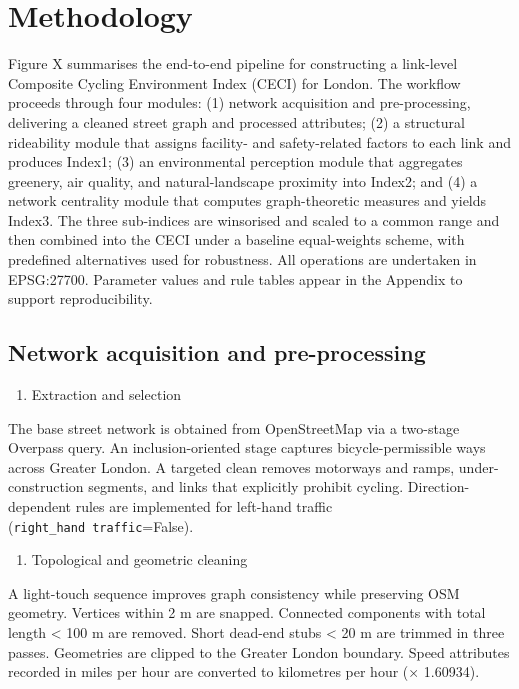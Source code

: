 \documentclass[
  12pt,
  oneside]{book}
\providecommand{\tightlist}{%
  \setlength{\itemsep}{0pt}\setlength{\parskip}{0pt}}
\begin{document}
\chapter{Methodology}\label{methodology}

Figure X summarises the end-to-end pipeline for constructing a link-level Composite Cycling Environment Index (CECI) for London. The workflow proceeds through four modules: (1) network acquisition and pre-processing, delivering a cleaned street graph and processed attributes; (2) a structural rideability module that assigns facility- and safety-related factors to each link and produces Index1; (3) an environmental perception module that aggregates greenery, air quality, and natural-landscape proximity into Index2; and (4) a network centrality module that computes graph-theoretic measures and yields Index3. The three sub-indices are winsorised and scaled to a common range and then combined into the CECI under a baseline equal-weights scheme, with predefined alternatives used for robustness. All operations are undertaken in EPSG:27700. Parameter values and rule tables appear in the Appendix to support reproducibility.

\section{Network acquisition and pre-processing}\label{network-acquisition-and-pre-processing}

\begin{enumerate}
\def\labelenumi{\arabic{enumi}.}
\tightlist
\item
  Extraction and selection
\end{enumerate}

The base street network is obtained from OpenStreetMap via a two-stage Overpass query. An inclusion-oriented stage captures bicycle-permissible ways across Greater London. A targeted clean removes motorways and ramps, under-construction segments, and links that explicitly prohibit cycling. Direction-dependent rules are implemented for left-hand traffic (\texttt{right\_hand\ traffic}=False).

\begin{enumerate}
\def\labelenumi{\arabic{enumi}.}
\setcounter{enumi}{1}
\tightlist
\item
  Topological and geometric cleaning
\end{enumerate}

A light-touch sequence improves graph consistency while preserving OSM geometry. Vertices within 2 m are snapped. Connected components with total length \textless{} 100 m are removed. Short dead-end stubs \textless{} 20 m are trimmed in three passes. Geometries are clipped to the Greater London boundary. Speed attributes recorded in miles per hour are converted to kilometres per hour (× 1.60934).
\end{document}
